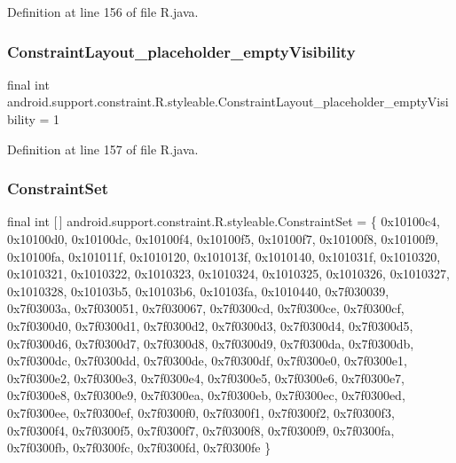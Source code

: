 Definition at line 156 of file R.\+java.

\mbox{\label{classandroid_1_1support_1_1constraint_1_1_r_1_1styleable_ac980dc4b72a5457ce99757e82e5b01bb}} 
\subsubsection{\texorpdfstring{ConstraintLayout\_placeholder\_emptyVisibility}{ConstraintLayout\_placeholder\_emptyVisibility}}
{\footnotesize\ttfamily final int android.\+support.\+constraint.\+R.\+styleable.\+Constraint\+Layout\+\_\+placeholder\+\_\+empty\+Visibility = 1\hspace{0.3cm}{\ttfamily [static]}}



Definition at line 157 of file R.\+java.

\mbox{\label{classandroid_1_1support_1_1constraint_1_1_r_1_1styleable_aa16c37eee601191a12a97dcf9222a0b9}} 
\subsubsection{\texorpdfstring{ConstraintSet}{ConstraintSet}}
{\footnotesize\ttfamily final int \mbox{[}$\,$\mbox{]} android.\+support.\+constraint.\+R.\+styleable.\+Constraint\+Set = \{ 0x10100c4, 0x10100d0, 0x10100dc, 0x10100f4, 0x10100f5, 0x10100f7, 0x10100f8, 0x10100f9, 0x10100fa, 0x101011f, 0x1010120, 0x101013f, 0x1010140, 0x101031f, 0x1010320, 0x1010321, 0x1010322, 0x1010323, 0x1010324, 0x1010325, 0x1010326, 0x1010327, 0x1010328, 0x10103b5, 0x10103b6, 0x10103fa, 0x1010440, 0x7f030039, 0x7f03003a, 0x7f030051, 0x7f030067, 0x7f0300cd, 0x7f0300ce, 0x7f0300cf, 0x7f0300d0, 0x7f0300d1, 0x7f0300d2, 0x7f0300d3, 0x7f0300d4, 0x7f0300d5, 0x7f0300d6, 0x7f0300d7, 0x7f0300d8, 0x7f0300d9, 0x7f0300da, 0x7f0300db, 0x7f0300dc, 0x7f0300dd, 0x7f0300de, 0x7f0300df, 0x7f0300e0, 0x7f0300e1, 0x7f0300e2, 0x7f0300e3, 0x7f0300e4, 0x7f0300e5, 0x7f0300e6, 0x7f0300e7, 0x7f0300e8, 0x7f0300e9, 0x7f0300ea, 0x7f0300eb, 0x7f0300ec, 0x7f0300ed, 0x7f0300ee, 0x7f0300ef, 0x7f0300f0, 0x7f0300f1, 0x7f0300f2, 0x7f0300f3, 0x7f0300f4, 0x7f0300f5, 0x7f0300f7, 0x7f0300f8, 0x7f0300f9, 0x7f0300fa, 0x7f0300fb, 0x7f0300fc, 0x7f0300fd, 0x7f0300fe \}\hspace{0.3cm}{\ttfamily [static]}}



